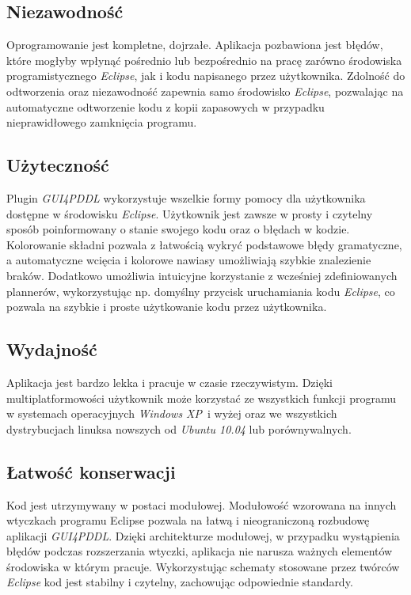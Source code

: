 \subsection*{Niezawodność}
Oprogramowanie jest kompletne, dojrzałe. Aplikacja pozbawiona jest błędów, które mogłyby wpłynąć pośrednio lub bezpośrednio na pracę zarówno środowiska programistycznego \emph{Eclipse}, jak i kodu napisanego przez użytkownika. Zdolność do odtworzenia oraz niezawodność zapewnia samo środowisko \emph{Eclipse}, pozwalając na automatyczne odtworzenie kodu z kopii zapasowych w przypadku nieprawidłowego zamknięcia programu.
\subsection*{Użyteczność}
Plugin \emph{GUI4PDDL} wykorzystuje wszelkie formy pomocy dla użytkownika dostępne w środowisku \emph{Eclipse}. Użytkownik jest zawsze w prosty i czytelny sposób poinformowany o stanie swojego kodu oraz o błędach w kodzie. Kolorowanie składni pozwala z łatwością wykryć podstawowe błędy gramatyczne, a automatyczne wcięcia i kolorowe nawiasy umożliwiają szybkie znalezienie braków. Dodatkowo umożliwia intuicyjne korzystanie z wcześniej zdefiniowanych plannerów, wykorzystując np. domyślny przycisk uruchamiania kodu \emph{Eclipse}, co pozwala na szybkie i proste użytkowanie kodu przez użytkownika.
\subsection*{Wydajność}
Aplikacja jest bardzo lekka i pracuje w czasie rzeczywistym. Dzięki multiplatformowości użytkownik może korzystać ze wszystkich funkcji programu w systemach operacyjnych \emph{Windows XP}\ i wyżej oraz we wszystkich dystrybucjach linuksa nowszych od \emph{Ubuntu 10.04} lub porównywalnych.
\subsection*{Łatwość konserwacji}
Kod jest utrzymywany w postaci modułowej. Modułowość wzorowana na innych wtyczkach programu Eclipse pozwala na łatwą i nieograniczoną rozbudowę aplikacji \emph{GUI4PDDL}. Dzięki architekturze modułowej, w przypadku wystąpienia błędów podczas rozszerzania wtyczki, aplikacja nie narusza ważnych elementów środowiska w którym pracuje. Wykorzystując schematy stosowane przez twórców \emph{Eclipse} kod jest stabilny i czytelny, zachowując odpowiednie standardy.


